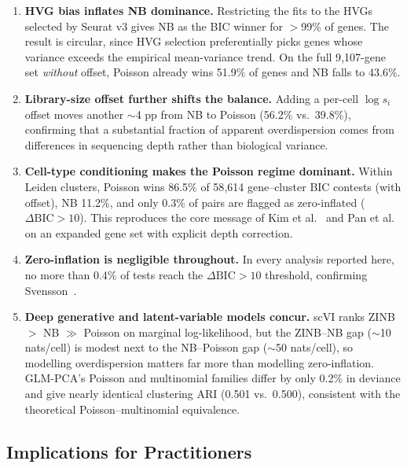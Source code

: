 \documentclass{article}
\begin{document}
\begin{enumerate}[nosep]
\item \textbf{HVG bias inflates NB dominance.}
  Restricting the fits to the HVGs selected by Seurat v3 gives NB as the BIC winner for $>$99\% of genes.
  The result is circular, since HVG selection preferentially picks genes whose variance exceeds the empirical mean-variance trend.
  On the full 9{,}107-gene set \emph{without} offset, Poisson already wins 51.9\% of genes and NB falls to 43.6\%.

\item \textbf{Library-size offset further shifts the balance.}
  Adding a per-cell $\log s_i$ offset moves another $\sim$4 pp from NB to Poisson (56.2\% vs.\ 39.8\%), confirming that a substantial fraction of apparent overdispersion comes from differences in sequencing depth rather than biological variance.

\item \textbf{Cell-type conditioning makes the Poisson regime dominant.}
  Within Leiden clusters, Poisson wins 86.5\% of 58{,}614 gene--cluster BIC contests (with offset), NB 11.2\%, and only 0.3\% of pairs are flagged as zero-inflated ($\Delta\text{BIC}>10$).
  This reproduces the core message of Kim et al.~\cite{kim2020demystifying} and Pan et al.~\cite{pan2023poisson} on an expanded gene set with explicit depth correction.

\item \textbf{Zero-inflation is negligible throughout.}
  In every analysis reported here, no more than 0.4\% of tests reach the $\Delta\text{BIC}>10$ threshold, confirming Svensson~\cite{svensson2020droplet}.

\item \textbf{Deep generative and latent-variable models concur.}
  scVI ranks ZINB $>$ NB $\gg$ Poisson on marginal log-likelihood, but the ZINB--NB gap ($\sim$10 nats/cell) is modest next to the NB--Poisson gap ($\sim$50 nats/cell), so modelling overdispersion matters far more than modelling zero-inflation.
  GLM-PCA's Poisson and multinomial families differ by only 0.2\% in deviance and give nearly identical clustering ARI (0.501 vs.\ 0.500), consistent with the theoretical Poisson--multinomial equivalence.
\end{enumerate}

\subsection{Implications for Practitioners}
\end{document}
